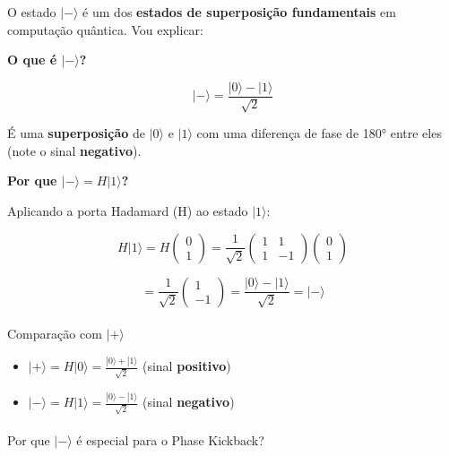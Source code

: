 \documentclass[
  brazilian,
]{report}
\makeatletter
\let\oldparagraph\paragraph
\renewcommand{\paragraph}{
    \@ifstar
      \xxxParagraphStar
      \xxxParagraphNoStar
  }
\newcommand{\xxxParagraphStar}[1]{\oldparagraph*{#1}\mbox{}}
\newcommand{\xxxParagraphNoStar}[1]{\oldparagraph{#1}\mbox{}}
\providecommand{\tightlist}{%
  \setlength{\itemsep}{0pt}\setlength{\parskip}{0pt}}
\makeatother
\begin{document}
O estado \(|-\rangle\) é um dos \textbf{estados de superposição
fundamentais} em computação quântica. Vou explicar:

\textbf{O que é \(|-\rangle\)?}

\[|-\rangle = \frac{|0\rangle - |1\rangle}{\sqrt{2}}\]

É uma \textbf{superposição} de \(|0\rangle\) e \(|1\rangle\) com uma
diferença de fase de 180° entre eles (note o sinal \textbf{negativo}).

\textbf{Por que \(|-\rangle = H|1\rangle\)?}

Aplicando a porta Hadamard (H) ao estado \(|1\rangle\):

\[H|1\rangle = H \begin{pmatrix} 0 \\ 1 \end{pmatrix} = \frac{1}{\sqrt{2}} \begin{pmatrix} 1 & 1 \\ 1 & -1 \end{pmatrix} \begin{pmatrix} 0 \\ 1 \end{pmatrix}\]

\[= \frac{1}{\sqrt{2}} \begin{pmatrix} 1 \\ -1 \end{pmatrix} = \frac{|0\rangle - |1\rangle}{\sqrt{2}} = |-\rangle\]

\paragraph{\texorpdfstring{Comparação com
\(|+\rangle\)}{Comparação com \textbar+\textbackslash rangle}}\label{comparauxe7uxe3o-com-rangle}

\begin{itemize}
\tightlist
\item
  \(|+\rangle = H|0\rangle = \frac{|0\rangle + |1\rangle}{\sqrt{2}}\)
  (sinal \textbf{positivo})
\item
  \(|-\rangle = H|1\rangle = \frac{|0\rangle - |1\rangle}{\sqrt{2}}\)
  (sinal \textbf{negativo})
\end{itemize}

\paragraph{\texorpdfstring{Por que \(|-\rangle\) é especial para o Phase
Kickback?}{Por que \textbar-\textbackslash rangle é especial para o Phase Kickback?}}\label{por-que--rangle-uxe9-especial-para-o-phase-kickback}
\end{document}
